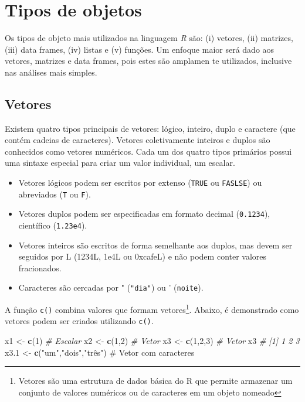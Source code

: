 \documentclass[
]{book}
\newenvironment{Shaded}{\begin{snugshade}}{\end{snugshade}}
\newcommand{\CommentTok}[1]{\textcolor[rgb]{0.56,0.35,0.01}{\textit{#1}}}
\newcommand{\DecValTok}[1]{\textcolor[rgb]{0.00,0.00,0.81}{#1}}
\newcommand{\FloatTok}[1]{\textcolor[rgb]{0.00,0.00,0.81}{#1}}
\newcommand{\KeywordTok}[1]{\textcolor[rgb]{0.13,0.29,0.53}{\textbf{#1}}}
\newcommand{\NormalTok}[1]{#1}
\newcommand{\StringTok}[1]{\textcolor[rgb]{0.31,0.60,0.02}{#1}}
\begin{document}
\hypertarget{objects}{%
\chapter{Tipos de objetos}\label{objects}}

Os tipos de objeto mais utilizados na linguagem \emph{R} são: (i) vetores, (ii) matrizes, (iii) data frames, (iv) listas e (v) funções. Um enfoque maior será dado aos vetores, matrizes e data frames, pois estes são amplamen
te utilizados, inclusive nas análises mais simples.

\hypertarget{vetores}{%
\section{Vetores}\label{vetores}}

Existem quatro tipos principais de vetores: lógico, inteiro, duplo e caractere (que contém cadeias de caracteres). Vetores coletivamente inteiros e duplos são conhecidos como vetores numéricos. Cada um dos quatro tipos primários possui uma sintaxe especial para criar um valor individual, um escalar.

\begin{itemize}
\item
  Vetores lógicos podem ser escritos por extenso (\texttt{TRUE} ou \texttt{FASLSE}) ou abreviados (\texttt{T} ou \texttt{F}).
\item
  Vetores duplos podem ser especificadas em formato decimal (\texttt{0.1234}), científico (\texttt{1.23e4}).
\item
  Vetores inteiros são escritos de forma semelhante aos duplos, mas devem ser seguidos por L (1234L, 1e4L ou 0xcafeL) e não podem conter valores fracionados.
\item
  Caracteres são cercadas por " (\texttt{"dia"}) ou ' (\texttt{\textquotesingle{}noite\textquotesingle{}}).
\end{itemize}

A função \texttt{c()}   combina valores que formam vetores\footnote{Vetores são uma estrutura de dados básica do R que permite armazenar um conjunto de valores numéricos ou de caracteres em um objeto nomeado}. Abaixo, é demonstrado como vetores podem ser criados utilizando \texttt{c()}.

\begin{Shaded}
\begin{Highlighting}[]
\NormalTok{x1 <-}\StringTok{ }\KeywordTok{c}\NormalTok{(}\DecValTok{1}\NormalTok{) }\CommentTok{# Escalar }
\NormalTok{x2 <-}\StringTok{ }\KeywordTok{c}\NormalTok{(}\DecValTok{1}\NormalTok{,}\DecValTok{2}\NormalTok{) }\CommentTok{# Vetor}
\NormalTok{x3 <-}\StringTok{ }\KeywordTok{c}\NormalTok{(}\DecValTok{1}\NormalTok{,}\DecValTok{2}\NormalTok{,}\DecValTok{3}\NormalTok{) }\CommentTok{# Vetor}
\NormalTok{x3}
\CommentTok{# [1] 1 2 3}
\NormalTok{x3}\FloatTok{.1}\NormalTok{ <-}\StringTok{ }\KeywordTok{c}\NormalTok{(}\StringTok{"um"}\NormalTok{,}\StringTok{"dois"}\NormalTok{,}\StringTok{"três") # Vetor com caracteres}
\end{Highlighting}
\end{Shaded}
\end{document}
